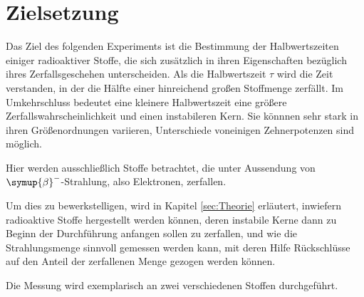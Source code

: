 \section{Zielsetzung}
\label{sec:Zielsetzung}

Das Ziel des folgenden Experiments ist die Bestimmung der Halbwertszeiten einiger radioaktiver Stoffe, die sich zusätzlich 
in ihren Eigenschaften bezüglich ihres Zerfallsgeschehen unterscheiden. 
Als die Halbwertszeit $\tau$ wird die Zeit verstanden, in der die Hälfte einer hinreichend großen Stoffmenge zerfällt. 
Im Umkehrschluss bedeutet eine kleinere Halbwertszeit eine größere Zerfallswahrscheinlichkeit und einen instabileren Kern. 
Sie könnnen sehr stark in ihren Größenordnungen variieren, Unterschiede voneinigen Zehnerpotenzen sind möglich. 

Hier werden ausschließlich Stoffe betrachtet, die unter Aussendung von $\symup{\beta}^-$-Strahlung, also Elektronen, zerfallen. 

Um dies zu bewerkstelligen, wird in Kapitel \ref{sec:Theorie} erläutert, inwiefern radioaktive Stoffe hergestellt werden können, 
deren instabile Kerne dann zu Beginn der Durchführung anfangen sollen zu zerfallen, und wie die Strahlungsmenge sinnvoll gemessen werden kann, mit deren Hilfe Rückschlüsse 
auf den Anteil der zerfallenen Menge gezogen werden können. 

Die Messung wird exemplarisch an zwei verschiedenen Stoffen durchgeführt. 